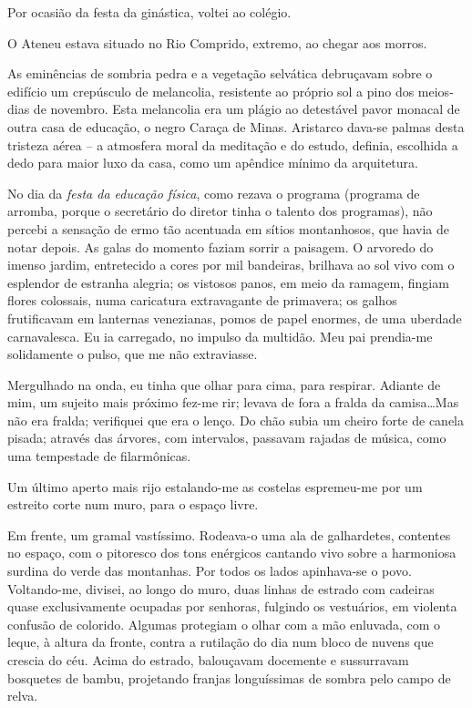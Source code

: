 Por ocasião da festa da ginástica, voltei ao colégio. 

O Ateneu estava situado no Rio Comprido, extremo, ao chegar aos morros.

As eminências de sombria pedra e a vegetação selvática debruçavam sobre
o edifício um crepúsculo de melancolia, resistente ao próprio sol a
pino dos meios{}-dias de novembro. Esta melancolia era um plágio ao
detestável pavor monacal de outra casa de educação, o negro Caraça de
Minas. Aristarco dava{}-se palmas desta tristeza aérea -- a atmosfera
moral da meditação e do estudo, definia, escolhida a dedo para maior
luxo da casa, como um apêndice mínimo da arquitetura. 

No dia da \textit{festa da educação física}, como rezava o programa (programa de arromba, 
porque o secretário do diretor tinha o talento dos programas), não percebi a
sensação de ermo tão acentuada em sítios montanhosos, que havia de
notar depois. As galas do momento faziam sorrir a paisagem. O arvoredo
do imenso jardim, entretecido a cores por mil bandeiras, brilhava ao
sol vivo com o esplendor de estranha alegria; os vistosos panos, em
meio da ramagem, fingiam flores colossais, numa caricatura extravagante
de primavera; os galhos frutificavam em lanternas venezianas, pomos de
papel enormes, de uma uberdade carnavalesca. Eu ia carregado, no
impulso da multidão. Meu pai prendia{}-me solidamente o pulso, que me
não extraviasse. 

Mergulhado na onda, eu tinha que olhar para cima, para
respirar. Adiante de mim, um sujeito mais próximo fez{}-me rir; levava
de fora a fralda da camisa\ldots Mas não era fralda; verifiquei que era o
lenço. Do chão subia um cheiro forte de canela pisada; através das
árvores, com intervalos, passavam rajadas de música, como uma
tempestade de filarmônicas. 

Um último aperto mais rijo estalando{}-me as costelas espremeu{}-me 
por um estreito corte num muro, para o espaço livre. 

Em frente, um gramal vastíssimo. Rodeava{}-o uma ala de
galhardetes, contentes no espaço, com o pitoresco dos tons enérgicos
cantando vivo sobre a harmoniosa surdina do verde das montanhas. Por
todos os lados apinhava{}-se o povo. Voltando{}-me, divisei, ao longo
do muro, duas linhas de estrado com cadeiras quase exclusivamente
ocupadas por senhoras, fulgindo os vestuários, em violenta confusão de
colorido. Algumas protegiam o olhar com a mão enluvada, com o leque, à
altura da fronte, contra a rutilação do dia num bloco de nuvens que crescia do
céu. Acima do estrado, balouçavam docemente e sussurravam bosquetes de
bambu, projetando franjas longuíssimas de sombra pelo campo de relva.

